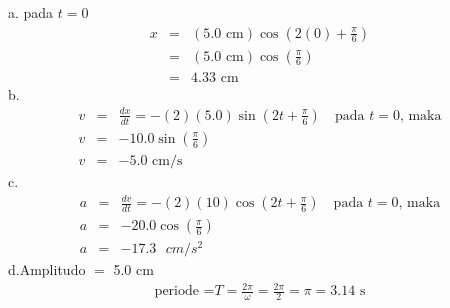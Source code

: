\begin{solution}
a. pada $t=0$
\begin{eqnarray*}
x&=&(5.0 \mbox{ cm})\cos(2(0)+\frac{\pi}{6}) \\
&=&(5.0 \mbox{ cm})\cos(\frac{\pi}{6}) \\
&=&4.33 \mbox{ cm}
\end{eqnarray*}
b. 
\begin{eqnarray*}
v&=&\frac{dx}{dt}=-(2)(5.0)\sin(2t+\frac{\pi}{6}) \quad \mbox{pada $t=0$, maka} \\
v&=&-10.0 \sin(\frac{\pi}{6}) \\
v&=&-5.0 \mbox{ cm/s}
\end{eqnarray*}
c.
\begin{eqnarray*}
a&=&\frac{dv}{dt}=-(2)(10) \cos(2t+\frac{\pi}{6}) \quad \mbox{pada $t=0$, maka} \\
a&=&-20.0 \cos(\frac{\pi}{6}) \\
a&=&-17.3 \mbox{ $cm/s^2$}
\end{eqnarray*}
d.\quad Amplitudo $=$ 5.0 cm \\
\begin{eqnarray*}
\textrm{periode =}T=\frac{2\pi}{\omega}=\frac{2\pi}{2}=\pi=3.14 \mbox{ s}
\end{eqnarray*}
\\[1.5cm]
\end{solution}
